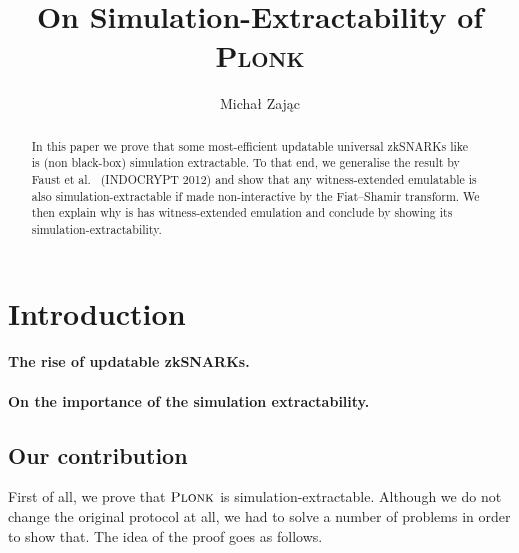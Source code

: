 \documentclass[runningheads]{llncs}
\title{On Simulation-Extractability of \textsc{Plonk}}
\author{Michał Zając}
\institute{Clearmatics, London, UK\\ \email{m.p.zajac@gmail.com}}
\theoremstyle{definition}
\begin{document}
	\sloppy
	\maketitle

\begin{abstract}
	In this paper we prove that some most-efficient updatable universal zkSNARKs like \plonk{}~\cite{EPRINT:GabWilCio19}  is (non black-box) simulation extractable. 
	To that end, we generalise the result by Faust et al.~\cite{INDOCRYPT:FKMV12} (INDOCRYPT 2012) and show that any witness-extended emulatable is also simulation-extractable if made non-interactive by the Fiat--Shamir transform. We then explain why \plonk{} is has witness-extended emulation and conclude by showing its simulation-extractability.
\end{abstract}

\section{Introduction}
\paragraph{The rise of updatable zkSNARKs.}
\cite{C:GKMMM18}
\cite{EC:CHMMVW20}
\cite{CCS:MBKM19}
\cite{EPRINT:GabWilCio19}
\cite{EPRINT:Gabizon19c}
\cite{EPRINT:Lipmaa19a}

\paragraph{On the importance of the simulation extractability.}
\cite{AC:DHLW10}
\cite{AC:Groth07}
\cite{EPRINT:AbdRamSla20}
\cite{EPRINT:KZMQCP15}
\cite{EPRINT:BagAta19}
\cite{EPRINT:Baghery20}



\subsection{Our contribution}
First of all, we prove that $\textsc{Plonk}$ is simulation-extractable. Although we do not change the original protocol at all, we had to solve a number of problems in order to show that. The idea of the proof goes as follows. 
\end{document}

